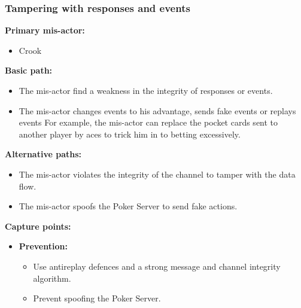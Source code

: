 \documentclass[a4paper,11pt]{report}
\begin{document}
\subsubsection{Tampering with responses and events}
\label{PlayerFlowCasesT4}
\textbf{Primary mis-actor:}
\begin{itemize}
\item Crook
\end{itemize}
\textbf{Basic path:}
\begin{itemize}
\item The mis-actor find a weakness in the integrity of responses or events.
\item The mis-actor changes events to his advantage, sends fake events or replays events For example, the mis-actor can replace the pocket cards sent to another player by aces to trick him in to betting excessively.
\end{itemize}
\textbf{Alternative paths:}
\begin{itemize}
\item The mis-actor violates the integrity of the channel to tamper with the data flow.
\item The mis-actor spoofs the Poker Server to send fake actions.
\end{itemize}
\textbf{Capture points:}
\begin{itemize}
\item \textbf{Prevention:}
\begin{itemize}
\item Use antireplay defences and a strong message and channel integrity algorithm.
\item Prevent spoofing the Poker Server.
\end{itemize}
\end{itemize}
\end{document}
